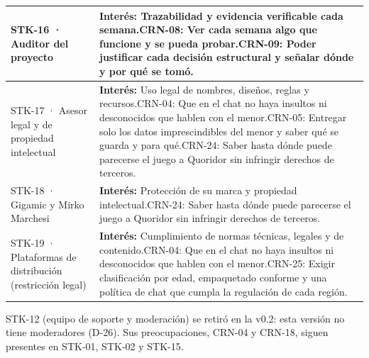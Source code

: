 \documentclass[11pt,letterpaper]{article}
\begin{document}
\begin{xltabular}{\linewidth}{|>{\raggedright\arraybackslash}p{4.2cm}|Y|}
  STK-16 · Auditor del proyecto & \textbf{Interés:} Trazabilidad y evidencia verificable cada semana.\newline CRN-08: Ver cada semana algo que funcione y se pueda probar.\newline CRN-09: Poder justificar cada decisión estructural y señalar dónde y por qué se tomó.\\\hline
  STK-17 · Asesor legal y de propiedad intelectual & \textbf{Interés:} Uso legal de nombres, diseños, reglas y recursos.\newline CRN-04: Que en el chat no haya insultos ni desconocidos que hablen con el menor.\newline CRN-05: Entregar solo los datos imprescindibles del menor y saber qué se guarda y para qué.\newline CRN-24: Saber hasta dónde puede parecerse el juego a Quoridor sin infringir derechos de terceros.\\\hline
  STK-18 · Gigamic y Mirko Marchesi & \textbf{Interés:} Protección de su marca y propiedad intelectual.\newline CRN-24: Saber hasta dónde puede parecerse el juego a Quoridor sin infringir derechos de terceros.\\\hline
  STK-19 · Plataformas de distribución (restricción legal) & \textbf{Interés:} Cumplimiento de normas técnicas, legales y de contenido.\newline CRN-04: Que en el chat no haya insultos ni desconocidos que hablen con el menor.\newline CRN-25: Exigir clasificación por edad, empaquetado conforme y una política de chat que cumpla la regulación de cada región.\\\hline
\end{xltabular}
{\small STK-12 (equipo de soporte y moderación) se retiró en la v0.2: esta versión no tiene moderadores (D-26). Sus preocupaciones, CRN-04 y CRN-18, siguen presentes en STK-01, STK-02 y STK-15.}\par
\end{document}
